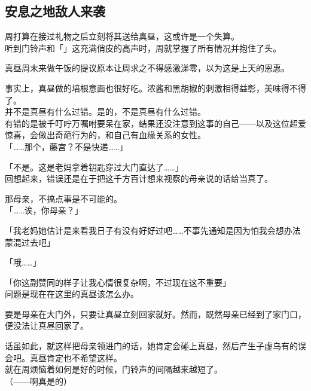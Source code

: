 \subsection{安息之地敌人来袭}

周打算在接过礼物之后立刻将其送给真昼，这或许是一个失算。\\

听到门铃声和「」这充满俏皮的高声时，周就掌握了所有情况并抱住了头。\\

\vspace{2\baselineskip}

真昼周末来做午饭的提议原本让周求之不得感激涕零，以为这是上天的恩惠。

事实上，真昼做的培根意面也很好吃。浓酱和黑胡椒的刺激相得益彰，美味得不得了。\\

并不是真昼有什么过错。是的，不是真昼有什么过错。\\

有错的是被千叮咛万嘱咐要呆在家，结果还没注意到这事的自己——以及这位超爱惊喜，会做出奇葩行为的，和自己有血缘关系的女性。\\

「……那个，藤宫？不是快递……」

「不是。这是老妈拿着钥匙穿过大门直达了……」\\

回想起来，错误还是在于把这千方百计想来视察的母亲说的话给当真了。

那母亲，不搞点事是不可能的。\\

「……诶，你母亲？」

「我老妈她估计是来看我日子有没有好好过吧……不事先通知是因为怕我会想办法蒙混过去吧」

「哦……」

「你这副赞同的样子让我心情很复杂啊，不过现在这不重要」\\

问题是现在在这里的真昼该怎么办。

要是母亲在大门外，只要让真昼立刻回家就好。然而，既然母亲已经到了家门口，便没法让真昼回家了。

话虽如此，就这样把母亲领进门的话，她肯定会碰上真昼，然后产生子虚乌有的误会吧。真昼肯定也不希望这样。\\

就在周烦恼着如何是好的时候，门铃声的间隔越来越短了。\\

（——啊真是的）

